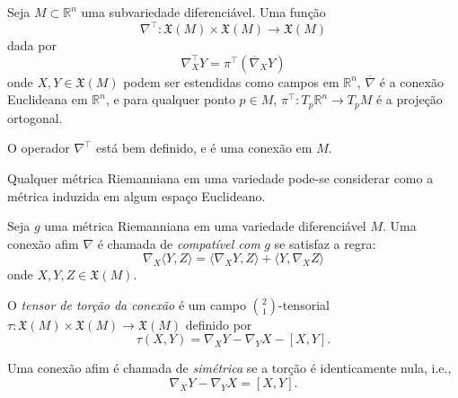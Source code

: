 \begin{definicao}
	Seja $M \subset \mathbb{R}^n$ uma subvariedade diferenciável. Uma função
	\begin{equation*}
		\nabla^\top: \mathfrak{X}(M) \times \mathfrak{X}(M) \rightarrow \mathfrak{X}(M)
	\end{equation*}
	dada por
	\begin{equation*}
		\nabla^\top_X Y = \pi^\top \left( \overline{\nabla}_X Y \right)
	\end{equation*}
	onde $X,Y \in \mathfrak{X}(M)$ podem ser estendidas como campos em $\mathbb{R}^n$, $\overline{\nabla}$ é a conexão Euclideana em $\mathbb{R}^n$, e para qualquer ponto $p \in M$, $\pi^\top: T_p \mathbb{R}^n \rightarrow T_p M$ é a projeção ortogonal.
\end{definicao}

\begin{lema}
	O operador $\nabla^\top$ está bem definido, e é uma conexão em $M$.
\end{lema}

\begin{teorema}
	Qualquer métrica Riemanniana em uma variedade pode-se considerar como a métrica induzida em algum espaço Euclideano.
\end{teorema}

\begin{definicao}
	Seja $g$ uma métrica Riemanniana em uma variedade diferenciável $M$. Uma conexão afim $\nabla$ é chamada de \emph{compatível com} $g$ se satisfaz a regra:
	\begin{equation*}
		\nabla_X \langle Y,Z \rangle = \langle \nabla_X Y, Z \rangle + \langle Y, \nabla_X Z \rangle
	\end{equation*}
	onde $X,Y,Z \in \mathfrak{X}(M)$.
\end{definicao}

\begin{definicao}
	O \emph{tensor de torção da conexão} é um campo $ \binom{2}{1} $-tensorial $\tau: \mathfrak{X}(M) \times \mathfrak{X}(M) \rightarrow \mathfrak{X}(M)$ definido por
	\begin{equation*}
		\tau(X,Y) = \nabla_X Y - \nabla_Y X - [X,Y].
	\end{equation*}
\end{definicao}

\begin{definicao}
	Uma conexão afim é chamada de \emph{simétrica} se a torção é identicamente nula, i.e.,
	\begin{equation*}
		\nabla_X Y - \nabla_Y X = [X,Y].
	\end{equation*}
\end{definicao}

